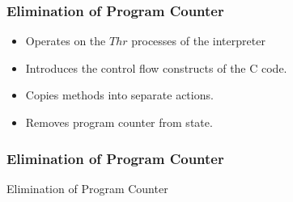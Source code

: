 \documentclass{beamer}
\begin{document}
\begin{frame}
  \frametitle{Elimination of Program Counter}
  \begin{itemize}
  \item Operates on the $Thr$ processes of the interpreter
  \item Introduces the control flow constructs of the C code.
  \item Copies methods into separate actions.
  \item Removes program counter from state.
  \end{itemize}
\end{frame}

\begin{frame}
  \frametitle{Elimination of Program Counter}
  \begin{algorithm}[H]
    \begin{algorithmic}[1]
      \State {}
      \State {}
      \State {}
      \State {}
      \State {}
      \EndWhile
      \State {}
      \State {}
    \end{algorithmic}
    \caption{Elimination of Program Counter}
  \end{algorithm}
\end{frame}
\end{document}
